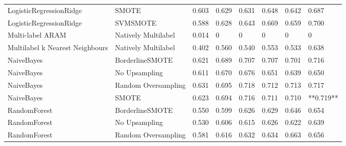 \begin{tabular}{llllllll}
        LogisticRegressionRidge &                         SMOTE & 0.603 &                     0.629 &                 0.631 &                  0.648 &                                   0.642 &     0.687 \\
        LogisticRegressionRidge &                      SVMSMOTE & 0.588 &                     0.628 &                 0.643 &                  0.669 &                                   0.659 &     0.700 \\
               Multi-label ARAM &           Natively Multilabel & 0.014 &                         0 &                     0 &                      0 &                                       0 &         0 \\
Multilabel k Nearest Neighbours &           Natively Multilabel & 0.402 &                     0.560 &                 0.540 &                  0.553 &                                   0.533 &     0.638 \\
                     NaiveBayes &               BorderlineSMOTE & 0.621 &                     0.689 &                 0.707 &                  0.707 &                                   0.701 &     0.716 \\
                     NaiveBayes &                 No Upsampling & 0.611 &                     0.670 &                 0.676 &                  0.651 &                                   0.639 &     0.650 \\
                     NaiveBayes &           Random Oversampling & 0.631 &                     0.695 &                 0.718 &                  0.712 &                                   0.713 &     0.717 \\
                     NaiveBayes &                         SMOTE & 0.623 &                     0.694 &                 0.716 &                  0.711 &                                   0.710 & **0.719** \\
                   RandomForest &               BorderlineSMOTE & 0.550 &                     0.599 &                 0.626 &                  0.629 &                                   0.646 &     0.654 \\
                   RandomForest &                 No Upsampling & 0.530 &                     0.606 &                 0.615 &                  0.626 &                                   0.622 &     0.639 \\
                   RandomForest &           Random Oversampling & 0.581 &                     0.616 &                 0.632 &                  0.634 &                                   0.663 &     0.656 \\

\end{tabular}
